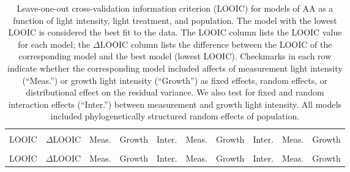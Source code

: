 \documentclass[
  letterpaper,
  DIV=11,
  numbers=noendperiod]{scrartcl}
\newcommand{\aax}{$\mathrm{AA}$}
\begin{document}
\begin{longtable}[t]{>{\centering\arraybackslash}p{0.7in}>{\centering\arraybackslash}p{0.5in}>{\centering\arraybackslash}p{0.4in}>{\centering\arraybackslash}p{0.4in}>{}c|>{\centering\arraybackslash}p{0.4in}>{\centering\arraybackslash}p{0.4in}>{}c|>{\centering\arraybackslash}p{0.4in}>{\centering\arraybackslash}p{0.4in}}

\caption{\label{tbl-aa_loo1}Leave-one-out cross-validation information
criterion (LOOIC) for models of \aax{} as a function of light intensity,
light treatment, and population. The model with the lowest LOOIC is
considered the best fit to the data. The LOOIC column lists the LOOIC
value for each model; the \(\Delta\)LOOIC column lists the difference
between the LOOIC of the corresponding model and the best model (lowest
LOOIC). Checkmarks in each row indicate whether the corresponding model
included affects of measurement light intensity (``Meas.'') or growth
light intensity (``Growth'') as fixed effects, random effects, or
distributional effect on the residual variance. We also test for fixed
and random interaction effects (``Inter.'') between measurement and
growth light intensity. All models included phylogenetically structured
random effects of population.}

\tabularnewline

\toprule
\multicolumn{2}{c}{ } & \multicolumn{3}{c}{Fixed} & \multicolumn{3}{c}{Random} & \multicolumn{2}{c}{Distributional} \\
\cmidrule(l{3pt}r{3pt}){3-5} \cmidrule(l{3pt}r{3pt}){6-8} \cmidrule(l{3pt}r{3pt}){9-10}
LOOIC & $\Delta$LOOIC & Meas. & Growth & Inter. & Meas. & Growth & Inter. & Meas. & Growth\\
\midrule
\endfirsthead
\multicolumn{10}{@{}l}{\textit{(continued)}}\\
\toprule
LOOIC & $\Delta$LOOIC & Meas. & Growth & Inter. & Meas. & Growth & Inter. & Meas. & Growth\\
\midrule
\endhead


\end{longtable}
\end{document}
